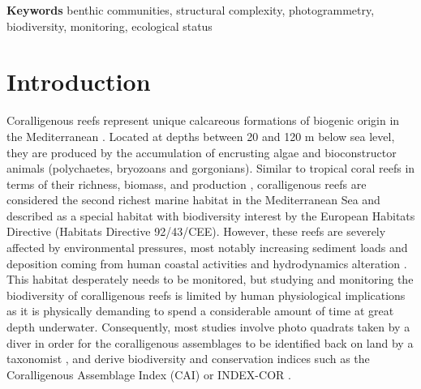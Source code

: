 \noindent\textbf{Keywords}
benthic communities, structural complexity, photogrammetry, biodiversity, monitoring, ecological status

\newpage

\section{Introduction}\label{chapitre4_1}
Coralligenous reefs represent unique calcareous formations of biogenic origin in the Mediterranean \citep{ballesteros_mediterranean_2006}. Located at depths between 20 and 120 m below sea level, they are produced by the accumulation of encrusting algae and bioconstructor animals (polychaetes, bryozoans and gorgonians). Similar to tropical coral reefs in terms of their richness, biomass, and production \citep{bianchi_biocostruzione_2001}, coralligenous reefs are considered the second richest marine habitat in the Mediterranean Sea \citep{boudouresque_marine_2004} and described as a special habitat with biodiversity interest by the European Habitats Directive (Habitats Directive 92/43/CEE). However, these reefs are severely affected by environmental pressures, most notably increasing sediment loads and deposition coming from human coastal activities and hydrodynamics alteration \citep{airoldi_effects_2003, ballesteros_mediterranean_2006}. This habitat desperately needs to be monitored, but studying and monitoring the biodiversity of coralligenous reefs is limited by human physiological implications as it is physically demanding to spend a considerable amount of time at great depth underwater. Consequently, most  studies involve photo quadrats taken by a diver in order for the coralligenous assemblages to be identified back on land by a taxonomist \citep{deter_rapid_2012, kipson_rapid_2011, sartoretto_integrated_2017}, and derive biodiversity and conservation indices such as the Coralligenous Assemblage Index (CAI) \citep{deter_preliminary_2012} or INDEX-COR \citep{sartoretto_integrated_2017}.

